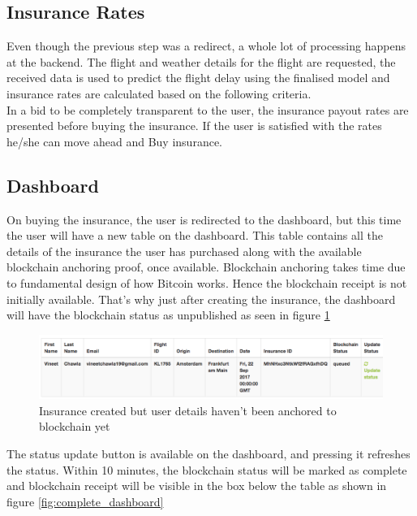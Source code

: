 \subsection{Insurance Rates}
Even though the previous step was a redirect, a whole lot of processing happens at the backend. The flight and weather details for the flight are requested, the received data is used to predict the flight delay using the finalised model and insurance rates are calculated based on the following criteria.
\\In a bid to be completely transparent to the user, the insurance payout rates are presented before buying the insurance. If the user is satisfied with the rates he/she can move ahead and Buy insurance.

\subsection{Dashboard}
On buying the insurance, the user is redirected to the dashboard, but this time the user will have a new table on the dashboard. This table contains all the details of the insurance the user has purchased along with the available blockchain anchoring proof, once available. Blockchain anchoring takes time due to fundamental design of how Bitcoin works. Hence the blockchain receipt is not initially available. That's why just after creating the insurance, the dashboard will have the blockchain status as unpublished as seen in figure \ref{fig:mid_dashboard}

\begin{figure}[h]
    \centering
    \includegraphics[width=\textwidth]{Figures/mid_dashboard.png}
    \caption{Insurance created but user details haven't been anchored to blockchain yet}
    \label{fig:mid_dashboard}
\end{figure}

The status update button is available on the dashboard, and pressing it refreshes the status. Within 10 minutes, the blockchain status will be marked as complete and blockchain receipt will be visible in the box below the table as shown in figure \ref{fig:complete_dashboard}

